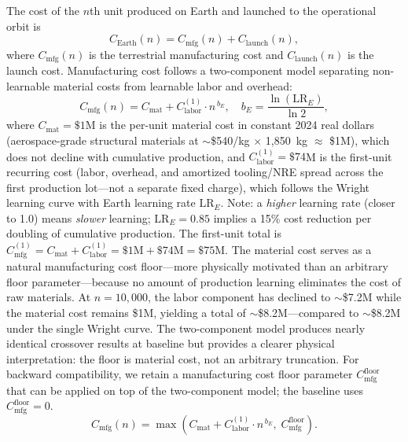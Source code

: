 \documentclass[preprint,12pt]{elsarticle}
\begin{document}
The cost of the $n$th unit produced on Earth and launched to the operational orbit is
\begin{equation}
  C_{\mathrm{Earth}}(n) = C_{\mathrm{mfg}}(n) + C_{\mathrm{launch}}(n),
  \label{eq:earth_unit}
\end{equation}
where $C_{\mathrm{mfg}}(n)$ is the terrestrial manufacturing cost and $C_{\mathrm{launch}}(n)$ is the launch cost. Manufacturing cost follows a two-component model separating non-learnable material costs from learnable labor and overhead:
\begin{equation}
  C_{\mathrm{mfg}}(n) = C_{\mathrm{mat}} + C_{\mathrm{labor}}^{(1)} \cdot n^{\,b_E}, \quad b_E = \frac{\ln(\mathrm{LR}_E)}{\ln 2},
  \label{eq:earth_mfg}
\end{equation}
where $C_{\mathrm{mat}} = \$1$M is the per-unit material cost in constant 2024 real dollars (aerospace-grade structural materials at $\sim$\$540/kg $\times$ 1{,}850~kg $\approx$ \$1M), which does not decline with cumulative production, and $C_{\mathrm{labor}}^{(1)} = \$74$M is the first-unit recurring cost (labor, overhead, and amortized tooling/NRE spread across the first production lot---not a separate fixed charge), which follows the Wright learning curve with Earth learning rate $\mathrm{LR}_E$. Note: a \emph{higher} learning rate (closer to 1.0) means \emph{slower} learning; $\mathrm{LR}_E = 0.85$ implies a 15\% cost reduction per doubling of cumulative production. The first-unit total is $C_{\mathrm{mfg}}^{(1)} = C_{\mathrm{mat}} + C_{\mathrm{labor}}^{(1)} = \$1\text{M} + \$74\text{M} = \$75\text{M}$. The material cost serves as a natural manufacturing cost floor---more physically motivated than an arbitrary floor parameter---because no amount of production learning eliminates the cost of raw materials. At $n = 10{,}000$, the labor component has declined to $\sim$\$7.2M while the material cost remains \$1M, yielding a total of $\sim$\$8.2M---compared to $\sim$\$8.2M under the single Wright curve. The two-component model produces nearly identical crossover results at baseline but provides a clearer physical interpretation: the floor is material cost, not an arbitrary truncation. For backward compatibility, we retain a manufacturing cost floor parameter $C_{\mathrm{mfg}}^{\mathrm{floor}}$ that can be applied on top of the two-component model; the baseline uses $C_{\mathrm{mfg}}^{\mathrm{floor}} = 0$.
\begin{equation}
  C_{\mathrm{mfg}}(n) = \max\!\left(C_{\mathrm{mat}} + C_{\mathrm{labor}}^{(1)} \cdot n^{\,b_E},\; C_{\mathrm{mfg}}^{\mathrm{floor}}\right).
  \label{eq:earth_mfg_floor}
\end{equation}
\end{document}
